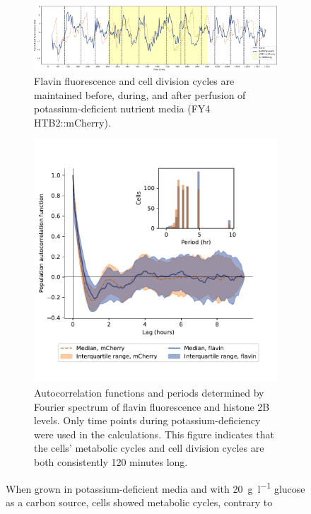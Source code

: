 \begin{figure}
  \centering
  \begin{subfigure}[htpb]{1.0\textwidth}
   \centering
   \includegraphics[width=\textwidth]{htb2mCherry_613_plots_single_htb2mCherry012_90_2_adapted.pdf}
   \caption{
     Flavin fluorescence and cell division cycles are maintained before, during, and after perfusion of potassium-deficient nutrient media (FY4 HTB2::mCherry).
   }
   \label{fig:biology-kdeficient-single}
  \end{subfigure}

  \begin{subfigure}[htpb]{0.7\textwidth}
   \centering
   \includegraphics[width=\textwidth]{htb2mCherry_613_12.pdf}
   \caption{
     Autocorrelation functions and periods determined by Fourier spectrum of flavin fluorescence and histone 2B levels.
     Only time points during potassium-deficiency were used in the calculations.
     This figure indicates that the cells' metabolic cycles and cell division cycles are both consistently 120 minutes long.
   }
   \label{fig:biology-kdeficient-acf}
  \end{subfigure}

  \caption{
    When grown in potassium-deficient media and with \SI{20}{\gram~\litre^{-1}} glucose as a carbon source, cells showed metabolic cycles, contrary to \textcite{oneillEukaryoticCellBiology2020}
  }
  \label{fig:biology-kdeficient}
\end{figure}

